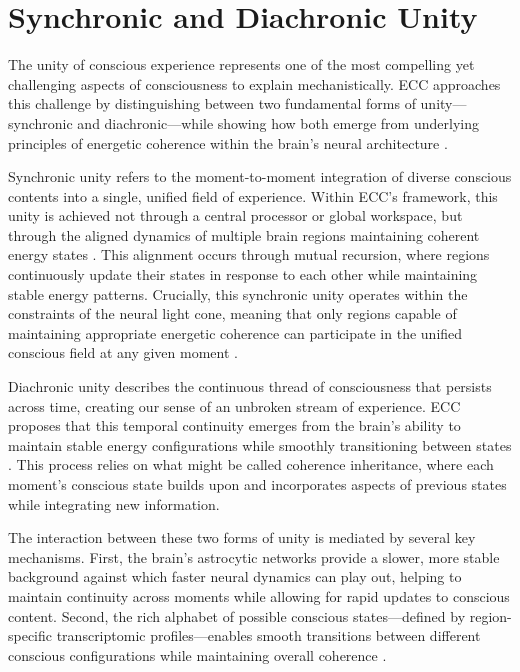 \section{Synchronic and Diachronic Unity}

The unity of conscious experience represents one of the most compelling yet challenging aspects of consciousness to explain mechanistically. ECC approaches this challenge by distinguishing between two fundamental forms of unity—synchronic and diachronic—while showing how both emerge from underlying principles of energetic coherence within the brain's neural architecture \cite{engel2001temporal}.

Synchronic unity refers to the moment-to-moment integration of diverse conscious contents into a single, unified field of experience. Within ECC's framework, this unity is achieved not through a central processor or global workspace, but through the aligned dynamics of multiple brain regions maintaining coherent energy states \cite{singer1999neuronal}. This alignment occurs through mutual recursion, where regions continuously update their states in response to each other while maintaining stable energy patterns. Crucially, this synchronic unity operates within the constraints of the neural light cone, meaning that only regions capable of maintaining appropriate energetic coherence can participate in the unified conscious field at any given moment \cite{gray1999temporal}.

Diachronic unity describes the continuous thread of consciousness that persists across time, creating our sense of an unbroken stream of experience. ECC proposes that this temporal continuity emerges from the brain's ability to maintain stable energy configurations while smoothly transitioning between states \cite{honey2012slow}. This process relies on what might be called coherence inheritance, where each moment's conscious state builds upon and incorporates aspects of previous states while integrating new information.

The interaction between these two forms of unity is mediated by several key mechanisms. First, the brain's astrocytic networks provide a slower, more stable background against which faster neural dynamics can play out, helping to maintain continuity across moments while allowing for rapid updates to conscious content. Second, the rich alphabet of possible conscious states—defined by region-specific transcriptomic profiles—enables smooth transitions between different conscious configurations while maintaining overall coherence \cite{womelsdorf2007modulation}.

